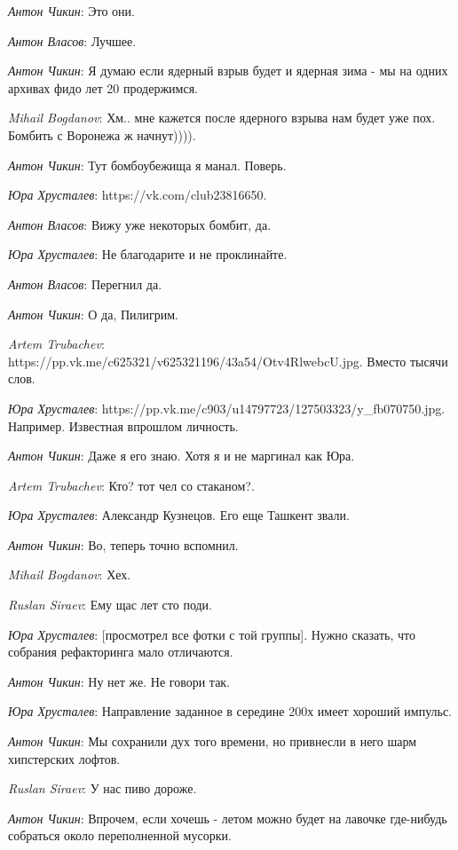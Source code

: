 \documentclass[10pt]{book}
\newcommand{\AUTHOR}[1]{\emph{#1}:}
\begin{document}
\AUTHOR{Антон Чикин} Это они.

\AUTHOR{Антон Власов} Лучшее.

\AUTHOR{Антон Чикин} Я думаю если ядерный взрыв будет и ядерная зима - мы на одних архивах фидо лет 20 продержимся.

\AUTHOR{Mihail Bogdanov} Хм.. мне кажется после ядерного взрыва нам будет уже пох. Бомбить с Воронежа ж начнут)))).

\AUTHOR{Антон Чикин} Тут бомбоубежища я манал. Поверь.

\AUTHOR{Юра Хрусталев} https://vk.com/club23816650.

\AUTHOR{Антон Власов} Вижу уже некоторых бомбит, да.

\AUTHOR{Юра Хрусталев} Не благодарите и не проклинайте.

\AUTHOR{Антон Власов} Перегнил да.

\AUTHOR{Антон Чикин} О да, Пилигрим.

\AUTHOR{Artem Trubachev} https://pp.vk.me/c625321/v625321196/43a54/Otv4RlwebcU.jpg. Вместо тысячи слов.

\AUTHOR{Юра Хрусталев} https://pp.vk.me/c903/u14797723/127503323/y_fb070750.jpg. Например. Известная впрошлом личность.

\AUTHOR{Антон Чикин} Даже я его знаю. Хотя я и не маргинал как Юра.

\AUTHOR{Artem Trubachev} Кто? тот чел со стаканом?.

\AUTHOR{Юра Хрусталев} Александр Кузнецов. Его еще Ташкент звали.

\AUTHOR{Антон Чикин} Во, теперь точно вспомнил.

\AUTHOR{Mihail Bogdanov} Хех.

\AUTHOR{Ruslan Siraev} Ему щас лет сто поди.

\AUTHOR{Юра Хрусталев} [просмотрел все фотки с той группы]. Нужно сказать, что собрания рефакторинга мало отличаются.

\AUTHOR{Антон Чикин} Ну нет же. Не говори так.

\AUTHOR{Юра Хрусталев} Направление заданное в середине 200х имеет хороший импульс.

\AUTHOR{Антон Чикин} Мы сохранили дух того времени, но привнесли в него шарм хипстерских лофтов.

\AUTHOR{Ruslan Siraev} У нас пиво дороже.

\AUTHOR{Антон Чикин} Впрочем, если хочешь - летом можно будет на лавочке где-нибудь собраться около переполненной мусорки.
\end{document}
